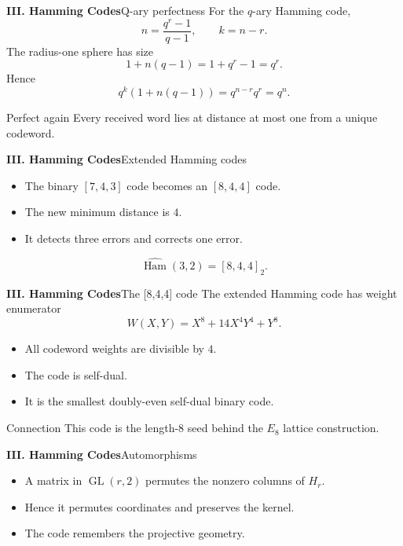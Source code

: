 \begin{frame}{\textbf{III. Hamming Codes}}{Q-ary perfectness}
\small
For the $q$-ary Hamming code,
\[
  n=\frac{q^r-1}{q-1},\qquad k=n-r.
\]
The radius-one sphere has size
\[
  1+n(q-1)=1+q^r-1=q^r.
\]
Hence
\[
  q^k(1+n(q-1))=q^{n-r}q^r=q^n.
\]
\begin{block}{Perfect again}
Every received word lies at distance at most one from a unique codeword.
\end{block}
\end{frame}

\begin{frame}{\textbf{III. Hamming Codes}}{Extended Hamming codes}
\small
{}
\begin{itemize}
  \item The binary $[7,4,3]$ code becomes an $[8,4,4]$ code.
  \item The new minimum distance is $4$.
  \item It detects three errors and corrects one error.
\end{itemize}
\[
  \widehat{\operatorname{Ham}}(3,2)=[8,4,4]_2.
\]
\end{frame}

\begin{frame}{\textbf{III. Hamming Codes}}{The [8,4,4] code}
\small
The extended Hamming code has weight enumerator
\[
  W(X,Y)=X^8+14X^4Y^4+Y^8.
\]
\begin{itemize}
  \item All codeword weights are divisible by $4$.
  \item The code is self-dual.
  \item It is the smallest doubly-even self-dual binary code.
\end{itemize}
\begin{block}{Connection}
This code is the length-$8$ seed behind the $E_8$ lattice construction.
\end{block}
\end{frame}

\begin{frame}{\textbf{III. Hamming Codes}}{Automorphisms}
\small
{}
\begin{itemize}
  \item A matrix in $\operatorname{GL}(r,2)$ permutes the nonzero columns of $H_r$.
  \item Hence it permutes coordinates and preserves the kernel.
  \item The code remembers the projective geometry.
\end{itemize}
\end{frame}

